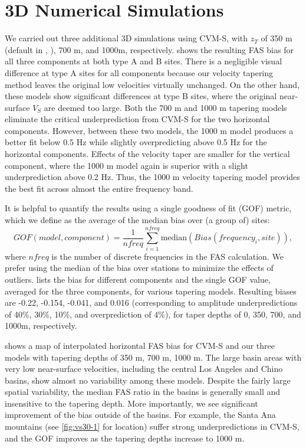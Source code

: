 \section{3D Numerical Simulations}
We carried out three additional 3D simulations using CVM-S, with $z_T$ of 350 m (default in , \citeyear{elyVs30derivedNearsurfaceSeismic2010}), 700 m, and 1000m, respectively.  shows the resulting FAS bias for all three components at both type A and B sites. There is a negligible visual difference at type A sites for all components because our velocity tapering method leaves the original low velocities virtually unchanged. On the other hand, these models show significant differences at type B sites, where the original near-surface $V_S$ are deemed too large. Both the 700 m and 1000 m tapering models eliminate the critical underprediction from CVM-S for the two horizontal components. However, between these two models, the 1000 m model produces a better fit below 0.5 Hz while slightly overpredicting above 0.5 Hz for the horizontal components. Effects of the velocity taper are smaller for the vertical component, where the 1000 m model again is superior with a slight underprediction above 0.2 Hz. Thus, the 1000 m velocity tapering model provides the best fit across almost the entire frequency band.

It is helpful to quantify the results using a single goodness of fit (GOF) metric, which we define as the average of the median bias over (a group of) sites:
\begin{equation}\label{eq:vs30-3}
  GOF(model, component) =\frac{1}{nfreq} \sum_{i=1}^{nfreq} \text{median}(Bias\left(frequency_{i}, site\right)),
\end{equation}
\noindent where $nfreq$ is the number of discrete frequencies in the FAS calculation. We prefer using the median of the bias over stations to minimize the effects of outliers.  lists the bias for different components and the single GOF value, averaged for the three components, for various tapering models. Resulting biases are -0.22, -0.154, -0.041, and 0.016 (corresponding to amplitude underpredictions of 40\%, 30\%, 10\%, and overprediction of 4\%), for taper depths of 0, 350, 700, and 1000m, respectively.

 shows a map of interpolated horizontal FAS bias for CVM-S and our three models with tapering depths of 350 m, 700 m, 1000 m. The large basin areas with very low near-surface velocities, including the central Los Angeles and Chino basins, show almost no variability among these models. Despite the fairly large spatial variability, the median FAS ratio in the basins is generally small and insensitive to the tapering depth. More importantly, we see significant improvement of the bias outside of the basins. For example, the Santa Ana mountains (see \cref{fig:vs30-1} for location) suffer strong underpredictions in CVM-S, and the GOF improves as the tapering depths increase to 1000 m.

